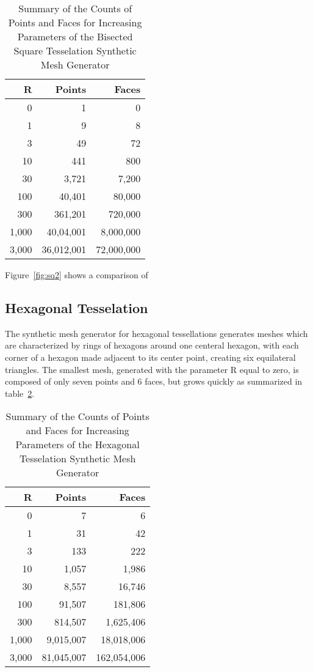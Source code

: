 \begin{table}[ht]
\begin{tabular}{rrr}
\textbf{R} & \textbf{Points} & \textbf{Faces} \\
\hline
    0 &          1 &          0\\
    1 &          9 &          8\\
    3 &         49 &         72\\
   10 &        441 &        800\\
   30 &      3,721 &      7,200\\
  100 &     40,401 &     80,000\\
  300 &    361,201 &    720,000\\
1,000 &  40,04,001 &  8,000,000\\
3,000 & 36,012,001 & 72,000,000%
\caption{Summary of the Counts of Points and Faces for Increasing Parameters of the Bisected Square Tesselation Synthetic Mesh Generator\label{tbl:sq2}}
\end{tabular}
\end{table}

Figure~\ref{fig:sq2} shows a comparison of


%
%
%
%

%
%
%
%
\subsection{Hexagonal Tesselation}
The synthetic mesh generator for hexagonal tessellations generates meshes which are characterized by rings of hexagons around one centeral hexagon, with each corner of a hexagon made adjacent to its center point, creating six equilateral triangles. The smallest mesh, generated with the parameter R equal to zero, is composed of only seven points and 6 faces, but grows quickly as summarized in table~\ref{tbl:hex}.

\begin{table}[ht]
\begin{tabular}{rrr}
\textbf{R} & \textbf{Points} & \textbf{Faces} \\
\hline
    0 &          7 &           6\\
    1 &         31 &          42\\
    3 &        133 &         222\\
   10 &      1,057 &       1,986\\
   30 &      8,557 &      16,746\\
  100 &     91,507 &     181,806\\
  300 &    814,507 &   1,625,406\\
1,000 &  9,015,007 &  18,018,006\\
3,000 & 81,045,007 & 162,054,006%
\caption{Summary of the Counts of Points and Faces for Increasing Parameters of the Hexagonal Tesselation Synthetic Mesh Generator\label{tbl:hex}}
\end{tabular}
\end{table}

